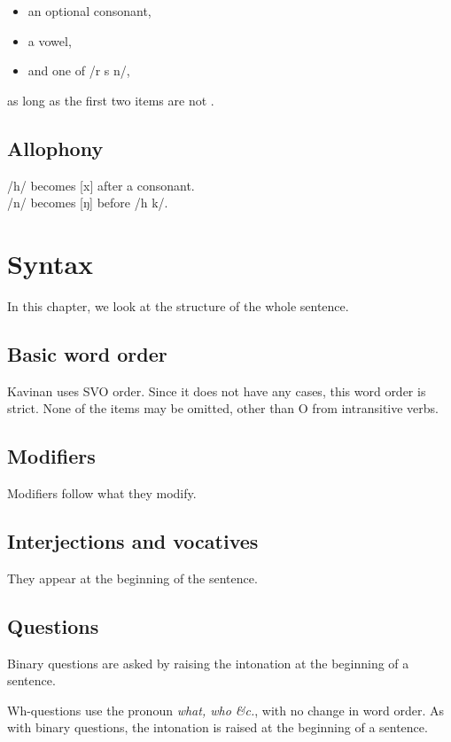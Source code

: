\documentclass{book}
\begin{document}
\begin{itemize}
    \item an optional consonant,
    \item a vowel,
    \item and one of /r s n/,
\end{itemize}

as long as the first two items are not .

\section{Allophony}

/h/ becomes [x] after a consonant. \\
/n/ becomes [ŋ] before /h k/.

\chapter{Syntax}

In this chapter, we look at the structure of the whole sentence.

\section{Basic word order}

Kavinan uses SVO order. Since it does not have any cases, this word order is strict. None of the items may be omitted, other than O from intransitive verbs.

\section{Modifiers}

Modifiers follow what they modify.

\section{Interjections and vocatives}

They appear at the beginning of the sentence.

\section{Questions}

Binary questions are asked by raising the intonation at the beginning of a sentence.

Wh-questions use the pronoun  \emph{what, who \&c.}, with no change in word order. As with binary questions, the intonation is raised at the beginning of a sentence.
\end{document}

